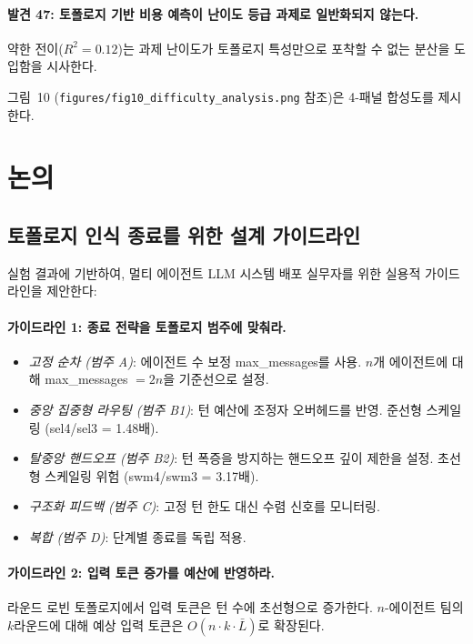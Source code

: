 \paragraph{발견 47: 토폴로지 기반 비용 예측이 난이도 등급 과제로 일반화되지 않는다.}
약한 전이($R^{2}=0.12$)는 과제 난이도가 토폴로지 특성만으로 포착할 수 없는 분산을 도입함을 시사한다.

그림~10 (\texttt{figures/fig10\_difficulty\_analysis.png} 참조)은 4-패널 합성도를 제시한다.

\section{논의}
\label{sec:discussion}

\subsection{토폴로지 인식 종료를 위한 설계 가이드라인}

실험 결과에 기반하여, 멀티 에이전트 LLM 시스템 배포 실무자를 위한 실용적 가이드라인을 제안한다:

\paragraph{가이드라인 1: 종료 전략을 토폴로지 범주에 맞춰라.}
\begin{itemize}
  \item \emph{고정 순차 (범주 A)}: 에이전트 수 보정 max\_messages를 사용. $n$개 에이전트에 대해 max\_messages $= 2n$을 기준선으로 설정.
  \item \emph{중앙 집중형 라우팅 (범주 B1)}: 턴 예산에 조정자 오버헤드를 반영. 준선형 스케일링 (sel4/sel3 = 1.48배).
  \item \emph{탈중앙 핸드오프 (범주 B2)}: 턴 폭증을 방지하는 핸드오프 깊이 제한을 설정. 초선형 스케일링 위험 (swm4/swm3 = 3.17배).
  \item \emph{구조화 피드백 (범주 C)}: 고정 턴 한도 대신 수렴 신호를 모니터링.
  \item \emph{복합 (범주 D)}: 단계별 종료를 독립 적용.
\end{itemize}

\paragraph{가이드라인 2: 입력 토큰 증가를 예산에 반영하라.}
라운드 로빈 토폴로지에서 입력 토큰은 턴 수에 초선형으로 증가한다. $n$-에이전트 팀의 $k$라운드에 대해 예상 입력 토큰은 $O(n \cdot k \cdot \bar{L})$로 확장된다.

